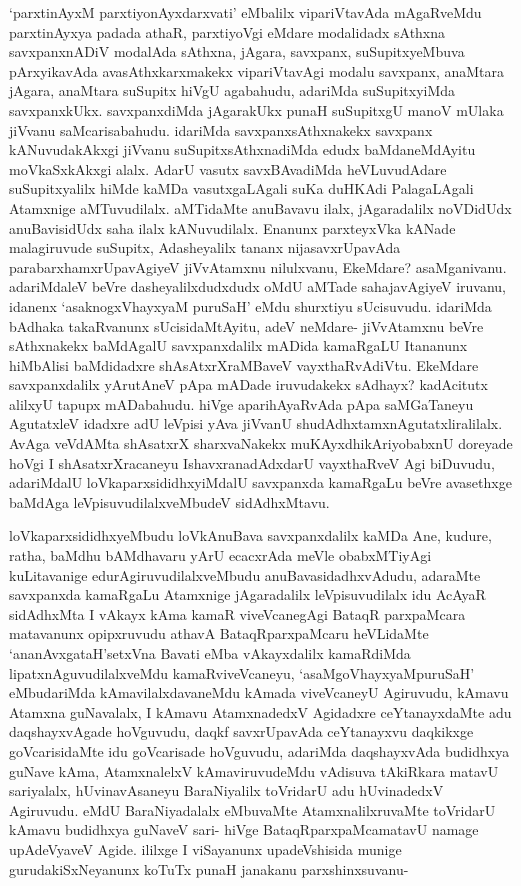 \begin{artha}
`parxtinAyxM parxtiyonAyxdarxvati' eMbalilx vipariVtavAda mAgaRveMdu parxtinAyxya padada athaR, parxtiyoVgi eMdare modalidadx sAthxna savxpanxnADiV modalAda sAthxna, jAgara, savxpanx, suSupitxyeMbuva pArxyikavAda avasAthxkarxmakekx vipariVtavAgi modalu savxpanx, anaMtara jAgara, anaMtara suSupitx hiVgU agabahudu, adariMda suSupitxyiMda savxpanxkUkx. savxpanxdiMda jAgarakUkx punaH suSupitxgU manoV mUlaka jiVvanu saMcarisabahudu. idariMda savxpanxsAthxnakekx savxpanx kANuvudakAkxgi jiVvanu suSupitxsAthxnadiMda edudx baMdaneMdAyitu moVkaSxkAkxgi alalx. AdarU vasutx savxBAvadiMda heVLuvudAdare suSupitxyalilx hiMde kaMDa vasutxgaLAgali suKa duHKAdi PalagaLAgali Atamxnige aMTuvudilalx. aMTidaMte anuBavavu ilalx, jAgaradalilx noVDidUdx anuBavisidUdx saha ilalx kANuvudilalx. Enanunx parxteyxVka kANade malagiruvude suSupitx, Adasheyalilx tananx nijasavxrUpavAda parabarxhamxrUpavAgiyeV jiVvAtamxnu nilulxvanu, EkeMdare? asaMganivanu. adariMdaleV beVre dasheyalilxdudxdudx oMdU aMTade sahajavAgiyeV iruvanu, idanenx `asaknogxVhayxyaM puruSaH' eMdu shurxtiyu sUcisuvudu. idariMda bAdhaka takaRvanunx sUcisidaMtAyitu, adeV neMdare- jiVvAtamxnu beVre sAthxnakekx baMdAgalU savxpanxdalilx mADida kamaRgaLU Itananunx hiMbAlisi baMdidadxre shAsAtxrXraMBaveV vayxthaRvAdiVtu. EkeMdare savxpanxdalilx yArutAneV pApa mADade iruvudakekx sAdhayx? kadAcitutx alilxyU tapupx mADabahudu. hiVge aparihAyaRvAda pApa saMGaTaneyu AgutatxleV idadxre adU leVpisi yAva jiVvanU shudAdhxtamxnAgutatxliralilalx. AvAga veVdAMta shAsatxrX sharxvaNakekx muKAyxdhikAriyobabxnU doreyade hoVgi I shAsatxrXracaneyu IshavxranadAdxdarU vayxthaRveV Agi biDuvudu, adariMdalU loVkaparxsididhxyiMdalU savxpanxda kamaRgaLu beVre avasethxge baMdAga leVpisuvudilalxveMbudeV sidAdhxMtavu.
\end{artha}%

\begin{artha}
loVkaparxsididhxyeMbudu loVkAnuBava savxpanxdalilx kaMDa Ane, kudure, ratha, baMdhu bAMdhavaru yArU ecacxrAda meVle obabxMTiyAgi kuLitavanige edurAgiruvudilalxveMbudu anuBavasidadhxvAdudu, adaraMte savxpanxda kamaRgaLu Atamxnige jAgaradalilx leVpisuvudilalx idu AcAyaR sidAdhxMta I vAkayx kAma kamaR viveVcanegAgi BataqR parxpaMcara matavanunx opipxruvudu athavA BataqRparxpaMcaru heVLidaMte `ananAvxgataH'setxVna Bavati eMba vAkayxdalilx kamaRdiMda lipatxnAguvudilalxveMdu kamaRviveVcaneyu, `asaMgoVhayxyaMpuruSaH' eMbudariMda kAmavilalxdavaneMdu kAmada viveVcaneyU Agiruvudu, kAmavu Atamxna guNavalalx, I kAmavu AtamxnadedxV Agidadxre ceYtanayxdaMte adu daqshayxvAgade hoVguvudu, daqkf savxrUpavAda ceYtanayxvu daqkikxge goVcarisidaMte idu goVcarisade hoVguvudu, adariMda daqshayxvAda budidhxya guNave kAma, AtamxnalelxV kAmaviruvudeMdu vAdisuva tAkiRkara matavU sariyalalx, hUvinavAsaneyu BaraNiyalilx toVridarU adu hUvinadedxV Agiruvudu. eMdU BaraNiyadalalx eMbuvaMte AtamxnalilxruvaMte toVridarU kAmavu budidhxya guNaveV sari- hiVge BataqRparxpaMcamatavU namage upAdeVyaveV Agide. ililxge I viSayanunx upadeVshisida munige gurudakiSxNeyanunx koTuTx punaH janakanu parxshinxsuvanu-
\end{artha}%

